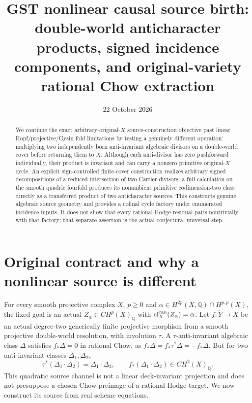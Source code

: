 \documentclass[11pt]{article}
\title{GST nonlinear causal source birth: double-world anticharacter products,
signed incidence components, and original-variety rational Chow extraction}
\date{22 October 2026}
\begin{document}
\maketitle
\begin{abstract}
We continue the exact arbitrary-original-$X$ source-construction objective
past linear Hopf/projective/Gysin fold limitations by testing a genuinely
different operation: multiplying two independently born anti-invariant
algebraic divisors on a double-world cover before returning them to $X$.
Although each anti-divisor has zero pushforward individually, their
product is invariant and can carry a nonzero primitive original-$X$
cycle. An explicit sign-controlled finite-cover construction realizes
arbitrary signed decompositions of a reduced intersection of two
Cartier divisors; a full calculation on the smooth quadric fourfold
produces its nonambient primitive codimension-two class directly as
a transferred product of two anticharacter sources. This constructs
genuine algebraic source geometry and provides a cofinal cycle
factory under enumerated incidence inputs. It does not show that
every rational Hodge residual pairs nontrivially with that factory;
that separate assertion is the actual conjectural universal step.
\end{abstract}

\section{Original contract and why a nonlinear source is different}
For every smooth projective complex $X$, $p\ge0$ and
$\alpha\in H^{2p}(X,\mathbb Q)\cap H^{p,p}(X)$, the fixed goal is
an actual $Z_\alpha\in CH^p(X)_{\mathbb Q}$ with
$\operatorname{cl}^{\rm can}_X(Z_\alpha)=\alpha$.
Let $f:\widetilde Y\to X$ be an actual degree-two generically
finite projective morphism from a smooth projective double-world
resolution, with involution $\tau$.
A $\tau$-anti-invariant algebraic class $\Delta$ satisfies
$f_*\Delta=0$ in rational Chow, as
$f_*\Delta=f_*\tau^*\Delta=-f_*\Delta$.
But for two anti-invariant classes $\Delta_1,\Delta_2$,
\[
 \tau^*(\Delta_1\cdot\Delta_2)
 =\Delta_1\cdot\Delta_2,\qquad
 f_*(\Delta_1\cdot\Delta_2)\in CH^2(X)_{\mathbb Q}. \tag{1}
\]
This quadratic source channel is not a linear deck-invariant
projection and does not presuppose a chosen Chow preimage of a
rational Hodge target. We now construct its source from real
scheme equations.
\end{document}
